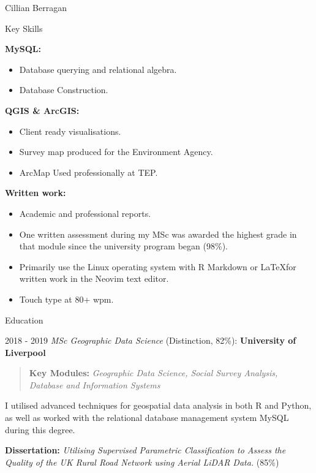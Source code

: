 \documentclass{scrartcl}
\begin{document}
\begin{cv}{Cillian Berragan}
\begin{cvlist}{Key Skills}
\vspace{5mm}
\item[\textbf{MySQL:}]\begin{itemize}\item Database querying and relational algebra.
\item Database Construction.
\end{itemize}

\vspace{5mm}
\item[\textbf{QGIS \& ArcGIS:}]\begin{itemize}\item Client ready visualisations.
\item Survey map produced for the Environment Agency.
\item ArcMap Used professionally at TEP.
\end{itemize}

\vspace{5mm}
\item[\textbf{Written work:}]\begin{itemize}\item Academic and professional reports.
\item One written assessment during my MSc was awarded the highest grade in that module since the university program began (98\%).
\item Primarily use the Linux operating system with R Markdown or \LaTeX for written work in the Neovim text editor.
\item Touch type at 80+ wpm.
\end{itemize}
\end{cvlist}

\newpage
\begin{cvlist}{Education}

\item[2018 - 2019] \normalsize\textit{MSc Geographic Data Science} (Distinction, 82\%): \textbf{University of Liverpool}

    \begin{quote}
        \small\textbf{Key Modules: }\textit{Geographic Data Science, Social Survey Analysis, Database and Information Systems}
    \end{quote}

    \small I utilised advanced techniques for geospatial data analysis in both R and Python, as well as worked with the relational database management system MySQL during this degree.

        \textbf{Dissertation:} \textit{Utilising Supervised Parametric Classification to Assess the Quality of the UK Rural Road Network using Aerial LiDAR Data.} (85\%)


\end{cvlist}
\end{cv}
\end{document}
